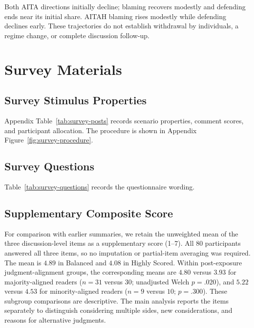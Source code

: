 Both AITA directions initially decline; blaming recovers modestly and
defending ends near its initial share. AITAH blaming rises modestly while
defending declines early. These trajectories do not establish withdrawal
by individuals, a regime change, or complete discussion follow-up.

\section{Survey Materials}
\label{sec:supp-survey}

\subsection{Survey Stimulus Properties}
\label{sec:supp-survey-stimulus-properties}

Appendix Table~\ref{tab:survey-posts} records scenario properties, comment scores,
and participant allocation. The procedure is shown in
Appendix Figure~\ref{fig:survey-procedure}.

\subsection{Survey Questions}
\label{sec:supp-survey-questions}

Table~\ref{tab:survey-questions} records the questionnaire wording.



\subsection{Supplementary Composite Score}
\label{sec:supp-survey-composite}

For comparison with earlier summaries, we retain the unweighted mean of
the three discussion-level items as a supplementary score (1--7).
All 80 participants answered all three items, so no imputation or
partial-item averaging was required. The mean is $4.89$ in Balanced
and $4.08$ in Highly Scored. Within post-exposure judgment-alignment groups, the corresponding
means are $4.80$ versus $3.93$ for majority-aligned readers
($n=31$ versus $30$; unadjusted Welch $p=.020$), and $5.22$ versus $4.53$
for minority-aligned readers ($n=9$ versus $10$; $p=.300$).
These subgroup comparisons are descriptive. The main analysis reports
the items separately to distinguish considering
multiple sides, new considerations, and reasons for alternative judgments.

